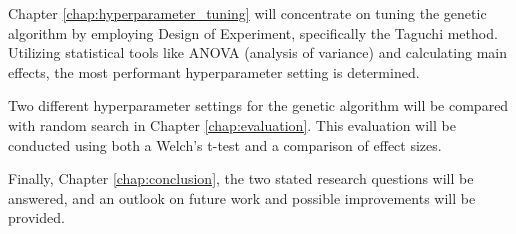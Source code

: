 Chapter \ref{chap:hyperparameter_tuning} will concentrate on tuning the genetic algorithm by employing Design of Experiment, specifically the Taguchi method. Utilizing statistical tools like ANOVA (analysis of variance) and calculating main effects, the most performant hyperparameter setting is determined.

Two different hyperparameter settings for the genetic algorithm will be compared with random search in Chapter \ref{chap:evaluation}. This evaluation will be conducted using both a Welch's t-test and a comparison of effect sizes.

Finally, Chapter \ref{chap:conclusion}, the two stated research questions will be answered, and an outlook on future work and possible improvements will be provided.






















